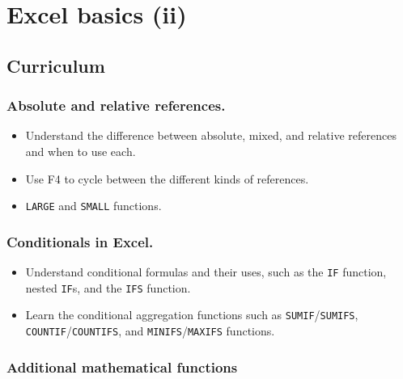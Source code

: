 \documentclass[
  letterpaper,
  DIV=11,
  numbers=noendperiod]{scrreprt}
\providecommand{\tightlist}{%
  \setlength{\itemsep}{0pt}\setlength{\parskip}{0pt}}\usepackage{longtable,booktabs,array}
\begin{document}

\hypertarget{excel-basics-ii}{%
\chapter{Excel basics (ii)}\label{excel-basics-ii}}

\hypertarget{curriculum-1}{%
\section{Curriculum}\label{curriculum-1}}

\hypertarget{absolute-and-relative-references.}{%
\subsection{Absolute and relative
references.}\label{absolute-and-relative-references.}}

\begin{itemize}
\tightlist
\item
  Understand the difference between absolute, mixed, and relative
  references and when to use each.
\item
  Use F4 to cycle between the different kinds of references.
\item
  \texttt{LARGE} and \texttt{SMALL} functions.
\end{itemize}

\hypertarget{conditionals-in-excel.}{%
\subsection{Conditionals in Excel.}\label{conditionals-in-excel.}}

\begin{itemize}
\tightlist
\item
  Understand conditional formulas and their uses, such as the
  \texttt{IF} function, nested \texttt{IF}s, and the \texttt{IFS}
  function.
\item
  Learn the conditional aggregation functions such as
  \texttt{SUMIF}/\texttt{SUMIFS}, \texttt{COUNTIF}/\texttt{COUNTIFS},
  and \texttt{MINIFS}/\texttt{MAXIFS} functions.
\end{itemize}

\hypertarget{additional-mathematical-functions}{%
\subsection{Additional mathematical
functions}\label{additional-mathematical-functions}}
\end{document}
